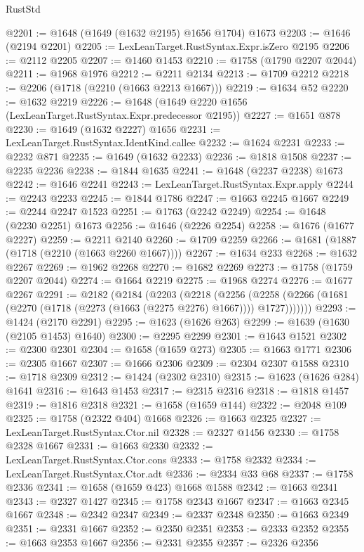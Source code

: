 \begin{lexlean}{RustStd}
\begin{coremodule}
@2201 := @1648 (@1649 (@1632 @2195) @1656 @1704) @1673
@2203 := @1646 (@2194 @2201)
@2205 := LexLeanTarget.RustSyntax.Expr.isZero @2195
@2206 := @2112 @2205
@2207 := @1460 @1453
@2210 := @1758 (@1790 @2207 @2044)
@2211 := @1968 @1976
@2212 := @2211 @2134
@2213 := @1709 @2212
@2218 := @2206 (@1718 (@2210 (@1663 @2213 @1667)))
@2219 := @1634 @52
@2220 := @1632 @2219
@2226 := @1648 (@1649 @2220 @1656 (LexLeanTarget.RustSyntax.Expr.predecessor @2195))
@2227 := @1651 @878
@2230 := @1649 (@1632 @2227) @1656
@2231 := LexLeanTarget.RustSyntax.IdentKind.callee
@2232 := @1624 @2231
@2233 := @2232 @871
@2235 := @1649 (@1632 @2233)
@2236 := @1818 @1508
@2237 := @2235 @2236
@2238 := @1844 @1635
@2241 := @1648 (@2237 @2238) @1673
@2242 := @1646 @2241
@2243 := LexLeanTarget.RustSyntax.Expr.apply
@2244 := @2243 @2233
@2245 := @1844 @1786
@2247 := @1663 @2245 @1667
@2249 := @2244 @2247 @1523
@2251 := @1763 (@2242 @2249)
@2254 := @1648 (@2230 @2251) @1673
@2256 := @1646 (@2226 @2254)
@2258 := @1676 (@1677 @2227)
@2259 := @2211 @2140
@2260 := @1709 @2259
@2266 := @1681 (@1887 (@1718 (@2210 (@1663 @2260 @1667))))
@2267 := @1634 @233
@2268 := @1632 @2267
@2269 := @1962 @2268
@2270 := @1682 @2269
@2273 := @1758 (@1759 @2207 @2044)
@2274 := @1664 @2219
@2275 := @1968 @2274
@2276 := @1677 @2267
@2291 := @2182
    (@2184
      (@2203
        (@2218
          (@2256
            (@2258 (@2266 (@1681 (@2270 (@1718 (@2273 (@1663 (@2275 @2276) @1667)))) @1727)))))))
@2293 := @1424 (@2170 @2291)
@2295 := @1623 (@1626 @263)
@2299 := @1639 (@1630 (@2105 @1453) @1640)
@2300 := @2295 @2299
@2301 := @1643 @1521
@2302 := @2300 @2301
@2304 := @1658 (@1659 @273)
@2305 := @1663 @1771
@2306 := @2305 @1667
@2307 := @1666 @2306
@2309 := @2304 @2307 @1588
@2310 := @1718 @2309
@2312 := @1424 (@2302 @2310)
@2315 := @1623 (@1626 @284) @1641
@2316 := @1643 @1453
@2317 := @2315 @2316
@2318 := @1818 @1457
@2319 := @1816 @2318
@2321 := @1658 (@1659 @144)
@2322 := @2048 @109
@2325 := @1758 (@2322 @404) @1668
@2326 := @1663 @2325
@2327 := LexLeanTarget.RustSyntax.Ctor.nil
@2328 := @2327 @1456
@2330 := @1758 @2328 @1667
@2331 := @1663 @2330
@2332 := LexLeanTarget.RustSyntax.Ctor.cons
@2333 := @1758 @2332
@2334 := LexLeanTarget.RustSyntax.Ctor.adt
@2336 := @2334 @33 @68
@2337 := @1758 @2336
@2341 := @1658 (@1659 @423) @1668 @1588
@2342 := @1663 @2341
@2343 := @2327 @1427
@2345 := @1758 @2343 @1667
@2347 := @1663 @2345 @1667
@2348 := @2342 @2347
@2349 := @2337 @2348
@2350 := @1663 @2349
@2351 := @2331 @1667
@2352 := @2350 @2351
@2353 := @2333 @2352
@2355 := @1663 @2353 @1667
@2356 := @2331 @2355
@2357 := @2326 @2356

\end{coremodule}
\end{lexlean}
